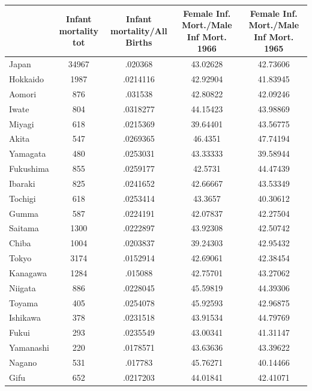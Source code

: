 \begin{tabular}{l*{4}{c}}
\hline\hline
            &Infant mortality tot&Infant mortality/All Births&Female Inf. Mort./Male Inf Mort. 1966&Female Inf. Mort./Male Inf Mort. 1965\\
\hline
Japan       &       34967&     .020368&    43.02628&    42.73606\\
Hokkaido    &        1987&    .0214116&    42.92904&    41.83945\\
Aomori      &         876&     .031538&    42.80822&    42.09246\\
Iwate       &         804&    .0318277&    44.15423&    43.98869\\
Miyagi      &         618&    .0215369&    39.64401&    43.56775\\
Akita       &         547&    .0269365&     46.4351&    47.74194\\
Yamagata    &         480&    .0253031&    43.33333&    39.58944\\
Fukushima   &         855&    .0259177&     42.5731&    44.47439\\
Ibaraki     &         825&    .0241652&    42.66667&    43.53349\\
Tochigi     &         618&    .0253414&     43.3657&    40.30612\\
Gumma       &         587&    .0224191&    42.07837&    42.27504\\
Saitama     &        1300&    .0222897&    43.92308&    42.50742\\
Chiba       &        1004&    .0203837&    39.24303&    42.95432\\
Tokyo       &        3174&    .0152914&    42.69061&    42.38454\\
Kanagawa    &        1284&     .015088&    42.75701&    43.27062\\
Niigata     &         886&    .0228045&    45.59819&    44.39306\\
Toyama      &         405&    .0254078&    45.92593&    42.96875\\
Ishikawa    &         378&    .0231518&    43.91534&    44.79769\\
Fukui       &         293&    .0235549&    43.00341&    41.31147\\
Yamanashi   &         220&    .0178571&    43.63636&    43.39622\\
Nagano      &         531&     .017783&    45.76271&    40.14466\\
Gifu        &         652&    .0217203&    44.01841&    42.41071\\

\end{tabular}
